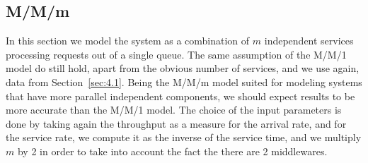 \documentclass[11pt,a4paper]{article}
\begin{document}
\subsection{M/M/m}

In this section we model the system as a combination of $m$ independent services processing requests out of a single queue.
The same assumption of the M/M/1 model do still hold, apart from the obvious number of services, and we use again, data from Section~\ref{sec:4.1}.
Being the M/M/m model suited for modeling systems that have more parallel independent components, we should expect results to be more accurate than the M/M/1 model.
The choice of the input parameters is done by taking again the throughput as a measure for the arrival rate, and for the service rate, we compute it as the inverse of the service time, and we multiply $m$ by 2 in order to take into account the fact the there are 2 middlewares.
\end{document}
